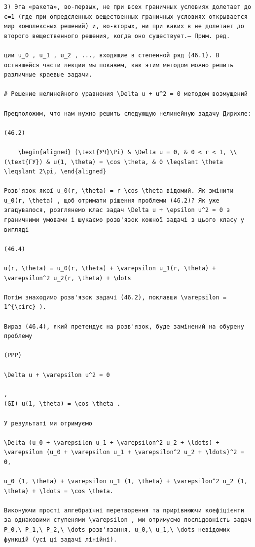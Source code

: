 \documentclass[
  ukrainian,
]{article}
\begin{document}
\begin{verbatim}
3) Эта «ракета», во-первых, не при всех граничных условиях долетает до є=1 (где при опредсленных вещественных граничных условиях открывается мир комплексных решений) и, во-вторых, ни при каких в не долетает до второго вещественного решения, когда оно существует.— Прим. ред.

ции u_0 , u_1 , u_2 , ..., входящие в степенной ряд (46.1). В оставшейся части лекции мы покажем, как этим методом можно решить различные краевые задачи.

# Решение нелинейного уравнения \Delta u + u^2 = 0 методом возмущений

Предположим, что нам нужно решить следующую нелинейную задачу Дирихле:

(46.2)

    \begin{aligned} (\text{УЧ}\Pi) & \Delta u = 0, & 0 < r < 1, \\ (\text{ГУ}) & u(1, \theta) = \cos \theta, & 0 \leqslant \theta \leqslant 2\pi, \end{aligned}

Розв'язок якої u_0(r, \theta) = r \cos \theta відомий. Як змінити u_0(r, \theta) , щоб отримати рішення проблеми (46.2)? Як уже згадувалося, розглянемо клас задач \Delta u + \epsilon u^2 = 0 з граничними умовами і шукаємо розв'язок кожної задачі з цього класу у вигляді

(46.4)

u(r, \theta) = u_0(r, \theta) + \varepsilon u_1(r, \theta) + \varepsilon^2 u_2(r, \theta) + \dots

Потім знаходимо розв'язок задачі (46.2), поклавши \varepsilon = 1^{\circ} ).

Вираз (46.4), який претендує на розв'язок, буде замінений на обурену проблему

(PPP)

\Delta u + \varepsilon u^2 = 0

, 
(GI) u(1, \theta) = \cos \theta .

У результаті ми отримуємо

\Delta (u_0 + \varepsilon u_1 + \varepsilon^2 u_2 + \ldots) + \varepsilon (u_0 + \varepsilon u_1 + \varepsilon^2 u_2 + \ldots)^2 = 0,

u_0 (1, \theta) + \varepsilon u_1 (1, \theta) + \varepsilon^2 u_2 (1, \theta) + \ldots = \cos \theta.

Виконуючи прості алгебраїчні перетворення та прирівнюючи коефіцієнти за однаковими ступенями \varepsilon , ми отримуємо послідовність задач P_0,\ P_1,\ P_2,\ \dots розв'язання, u_0,\ u_1,\ \dots невідомих функцій (усі ці задачі лінійні).


\end{verbatim}
\end{document}
